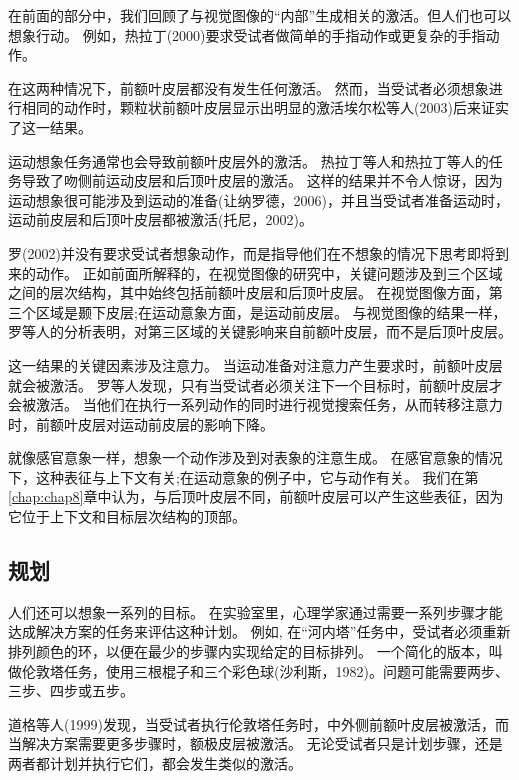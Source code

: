 在前面的部分中，我们回顾了与视觉图像的“内部”生成相关的激活。但人们也可以想象行动。
例如，热拉丁(2000)要求受试者做简单的手指动作或更复杂的手指动作。
\par


在这两种情况下，前额叶皮层都没有发生任何激活。
然而，当受试者必须想象进行相同的动作时，颗粒状前额叶皮层显示出明显的激活埃尔松等人(2003)后来证实了这一结果。
\par


运动想象任务通常也会导致前额叶皮层外的激活。
热拉丁等人和热拉丁等人的任务导致了吻侧前运动皮层和后顶叶皮层的激活。
这样的结果并不令人惊讶，因为运动想象很可能涉及到运动的准备(让纳罗德，2006)，并且当受试者准备运动时，运动前皮层和后顶叶皮层都被激活(托尼，2002)。
\par


罗(2002)并没有要求受试者想象动作，而是指导他们在不想象的情况下思考即将到来的动作。
正如前面所解释的，在视觉图像的研究中，关键问题涉及到三个区域之间的层次结构，其中始终包括前额叶皮层和后顶叶皮层。
在视觉图像方面，第三个区域是颞下皮层;在运动意象方面，是运动前皮层。
与视觉图像的结果一样，罗等人的分析表明，对第三区域的关键影响来自前额叶皮层，而不是后顶叶皮层。
\par


这一结果的关键因素涉及注意力。
当运动准备对注意力产生要求时，前额叶皮层就会被激活。
罗等人发现，只有当受试者必须关注下一个目标时，前额叶皮层才会被激活。
当他们在执行一系列动作的同时进行视觉搜索任务，从而转移注意力时，前额叶皮层对运动前皮层的影响下降。
\par


就像感官意象一样，想象一个动作涉及到对表象的注意生成。
在感官意象的情况下，这种表征与上下文有关;在运动意象的例子中，它与动作有关。
我们在第\ref{chap:chap8}章中认为，与后顶叶皮层不同，前额叶皮层可以产生这些表征，因为它位于上下文和目标层次结构的顶部。
\par



\subsection{规划}

人们还可以想象一系列的目标。
在实验室里，心理学家通过需要一系列步骤才能达成解决方案的任务来评估这种计划。
例如, 在“河内塔”任务中，受试者必须重新排列颜色的环，以便在最少的步骤内实现给定的目标排列。
一个简化的版本，叫做伦敦塔任务，使用三根棍子和三个彩色球(沙利斯，1982)。问题可能需要两步、三步、四步或五步。
\par


道格等人(1999)发现，当受试者执行伦敦塔任务时，中外侧前额叶皮层被激活，而当解决方案需要更多步骤时，额极皮层被激活。
无论受试者只是计划步骤，还是两者都计划并执行它们，都会发生类似的激活。
\par


